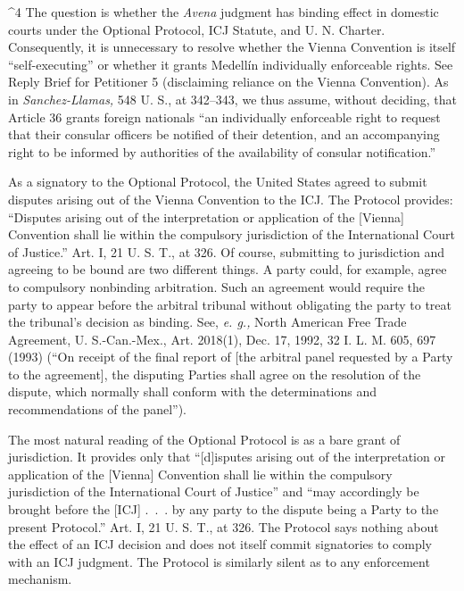 {{{^4 The question is whether the \emph{Avena} judgment has binding effect
in domestic courts under the Optional Protocol, ICJ Statute, and U.
N. Charter. Consequently, it is unnecessary to resolve whether the
Vienna Convention is itself ``self-executing'' or whether it grants
Medellín individually enforceable rights. See Reply Brief for
Petitioner 5 (disclaiming reliance on the Vienna Convention). As in
\emph{Sanchez-Llamas,} 548 U. S., at 342--343, we thus assume, without
deciding, that Article 36 grants foreign nationals ``an individually
enforceable right to request that their consular officers be notified of
their detention, and an accompanying right to be informed by authorities
of the availability of consular notification.''

  As a signatory to the Optional Protocol, the United States agreed to
submit disputes arising out of the Vienna Convention to the ICJ. The
Protocol provides: ``Disputes arising out of the interpretation or
application of the [Vienna] Convention shall lie within the compulsory
jurisdiction of the International Court of Justice.'' Art. I, 21 U.
S. T., at 326. Of course, submitting to jurisdiction and agreeing to
be bound are two different things. A party could, for example, agree
to compulsory nonbinding arbitration. Such an agreement would require
the party to appear before the arbitral tribunal without obligating the
party to treat the tribunal's decision as binding. See, \emph{e. g.,}
North American Free Trade Agreement, U. S.-Can.-Mex., Art. 2018(1),
Dec. 17, 1992, 32 I. L. M. 605, 697 (1993) (``On receipt of the final
report of [the arbitral panel requested by a Party to the agreement],
the disputing Parties shall agree on the resolution of the dispute,
which normally shall conform with the determinations and recommendations
of the panel'').

  The most natural reading of the Optional Protocol is as a bare grant
of jurisdiction. It provides only that ``[d]isputes arising out of
the interpretation or application of the [Vienna] Convention shall
lie within the compulsory jurisdiction of the International Court of
Justice'' and ``may accordingly be brought before the [ICJ] .~.~.
by any party to the dispute being a Party to the present Protocol.''
Art. I, 21 U. S. T., at 326. The Protocol says nothing about the
effect of an ICJ decision and does not itself commit signatories to
\newpage  comply with an ICJ judgment. The Protocol is similarly silent as
to any enforcement mechanism.

}}}
